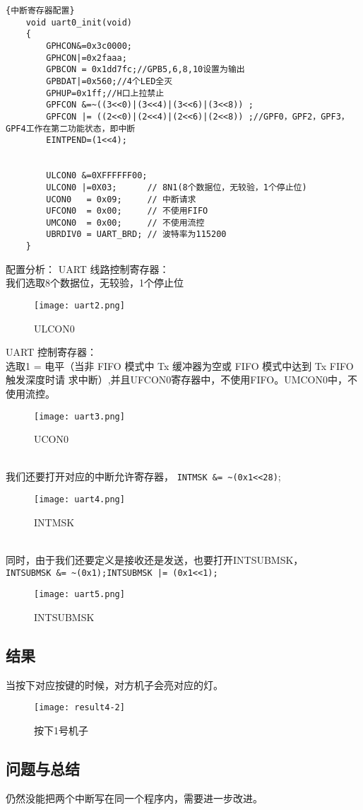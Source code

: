 \lstset{language=C}
\begin{lstlisting}{中断寄存器配置}
    void uart0_init(void)
    {
        GPHCON&=0x3c0000;
        GPHCON|=0x2faaa;
        GPBCON = 0x1dd7fc;//GPB5,6,8,10设置为输出
        GPBDAT|=0x560;//4个LED全灭
        GPHUP=0x1ff;//H口上拉禁止
        GPFCON &=~((3<<0)|(3<<4)|(3<<6)|(3<<8)) ;
        GPFCON |= ((2<<0)|(2<<4)|(2<<6)|(2<<8)) ;//GPF0，GPF2，GPF3，GPF4工作在第二功能状态，即中断
        EINTPEND=(1<<4);
    
        
        ULCON0 &=0XFFFFFF00;
        ULCON0 |=0X03;      // 8N1(8个数据位，无较验，1个停止位)
        UCON0   = 0x09;     // 中断请求
        UFCON0  = 0x00;     // 不使用FIFO
        UMCON0  = 0x00;     // 不使用流控
        UBRDIV0 = UART_BRD; // 波特率为115200
    }

\end{lstlisting}
配置分析：
UART 线路控制寄存器： \\
我们选取8个数据位，无较验，1个停止位\\
 \begin{figure}[h]
    \centering
    \texttt{[image: uart2.png]}
    \caption{ULCON0}
\end{figure}
UART 控制寄存器： \\
选取1 = 电平（当非 FIFO 模式中 Tx 缓冲器为空或 FIFO 模式中达到 Tx FIFO 触发深度时请
求中断）,并且UFCON0寄存器中，不使用FIFO。UMCON0中，不使用流控。\\
\begin{figure}[h]
    \centering
    \texttt{[image: uart3.png]}
    \caption{UCON0}
\end{figure}
\\
我们还要打开对应的中断允许寄存器，
\lstinline{INTMSK &= ~(0x1<<28)};
\begin{figure}[h]
    \centering
    \texttt{[image: uart4.png]}
    \caption{INTMSK}
\end{figure}
\\
同时，由于我们还要定义是接收还是发送，也要打开INTSUBMSK，\\
\lstinline{INTSUBMSK &= ~(0x1);INTSUBMSK |= (0x1<<1);}
\begin{figure}[h]
    \centering
    \texttt{[image: uart5.png]}
    \caption{INTSUBMSK}
\end{figure}

\subsection{结果}
当按下对应按键的时候，对方机子会亮对应的灯。
\begin{figure}[htbp]
    \centering
    \texttt{[image: result4-2]}
    \caption{按下1号机子}
\end{figure}
\subsection{问题与总结}
仍然没能把两个中断写在同一个程序内，需要进一步改进。
